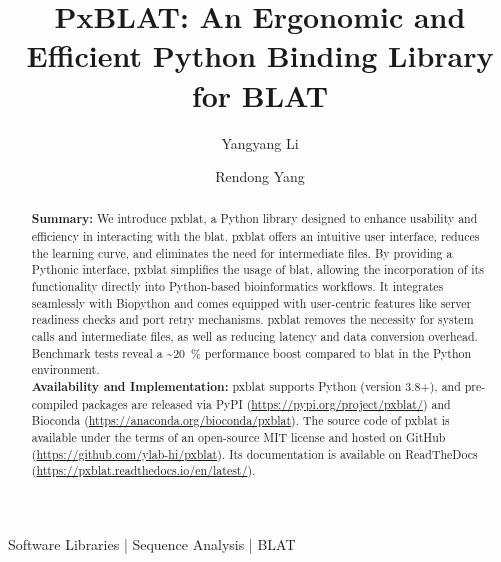 
\title{PxBLAT: An Ergonomic and Efficient Python Binding Library for BLAT}

\author[1]{Yangyang Li}
\author[1,\Letter]{Rendong Yang }
\date{}

\maketitle

\begin{abstract}
	\textbf{Summary:}
	We introduce \gls{pxblat}, a Python library designed to enhance usability and efficiency in interacting with the \gls{blat}.
	\gls{pxblat} offers an intuitive user interface, reduces the learning curve, and eliminates the need for intermediate files.
	By providing a Pythonic interface, \gls{pxblat} simplifies the usage of \gls{blat}, allowing the incorporation of its functionality directly into Python-based bioinformatics workflows.
	It integrates seamlessly with Biopython and comes equipped with user-centric features like server readiness checks and port retry mechanisms.
	\gls{pxblat} removes the necessity for system calls and intermediate files, as well as reducing latency and data conversion overhead.
	Benchmark tests reveal a \textasciitilde\SI[per-mode=symbol,round-precision=0]{20}{\percent} performance boost compared to \gls{blat} in the Python environment. \\

	\textbf{Availability and Implementation:}
	\gls{pxblat} supports Python (version 3.8+), and pre-compiled packages are released via PyPI (\url{https://pypi.org/project/pxblat/}) and Bioconda (\url{https://anaconda.org/bioconda/pxblat}).
	The source code of \gls{pxblat}  is available under the terms of an open-source MIT license and hosted on GitHub (\url{https://github.com/ylab-hi/pxblat}).
	Its documentation is available on ReadTheDocs (\url{https://pxblat.readthedocs.io/en/latest/}).
\end{abstract}

\begin{keywords}
	Software Libraries |  Sequence Analysis | BLAT
\end{keywords}

